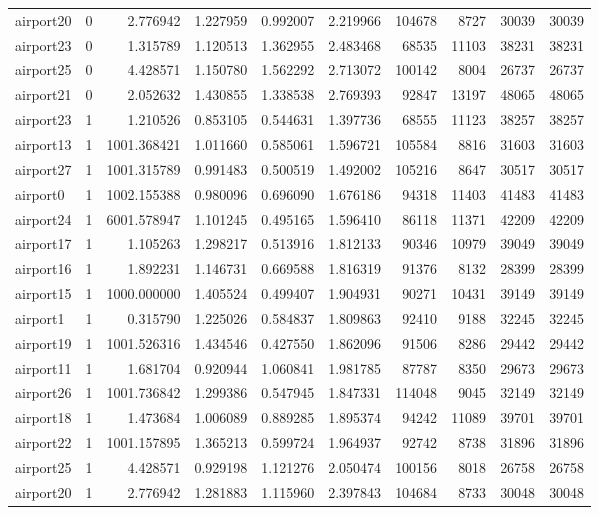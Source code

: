 \begin{longtable}{|l|r|r|r|r|r|r|r|r|r|}
airport20 & 0 & 2.776942 & 1.227959 & 0.992007 & 2.219966 & 104678 & 8727 & 30039 & 30039 \\
airport23 & 0 & 1.315789 & 1.120513 & 1.362955 & 2.483468 & 68535 & 11103 & 38231 & 38231 \\
airport25 & 0 & 4.428571 & 1.150780 & 1.562292 & 2.713072 & 100142 & 8004 & 26737 & 26737 \\
airport21 & 0 & 2.052632 & 1.430855 & 1.338538 & 2.769393 & 92847 & 13197 & 48065 & 48065 \\
airport23 & 1 & 1.210526 & 0.853105 & 0.544631 & 1.397736 & 68555 & 11123 & 38257 & 38257 \\
airport13 & 1 & 1001.368421 & 1.011660 & 0.585061 & 1.596721 & 105584 & 8816 & 31603 & 31603 \\
airport27 & 1 & 1001.315789 & 0.991483 & 0.500519 & 1.492002 & 105216 & 8647 & 30517 & 30517 \\
airport0 & 1 & 1002.155388 & 0.980096 & 0.696090 & 1.676186 & 94318 & 11403 & 41483 & 41483 \\
airport24 & 1 & 6001.578947 & 1.101245 & 0.495165 & 1.596410 & 86118 & 11371 & 42209 & 42209 \\
airport17 & 1 & 1.105263 & 1.298217 & 0.513916 & 1.812133 & 90346 & 10979 & 39049 & 39049 \\
airport16 & 1 & 1.892231 & 1.146731 & 0.669588 & 1.816319 & 91376 & 8132 & 28399 & 28399 \\
airport15 & 1 & 1000.000000 & 1.405524 & 0.499407 & 1.904931 & 90271 & 10431 & 39149 & 39149 \\
airport1 & 1 & 0.315790 & 1.225026 & 0.584837 & 1.809863 & 92410 & 9188 & 32245 & 32245 \\
airport19 & 1 & 1001.526316 & 1.434546 & 0.427550 & 1.862096 & 91506 & 8286 & 29442 & 29442 \\
airport11 & 1 & 1.681704 & 0.920944 & 1.060841 & 1.981785 & 87787 & 8350 & 29673 & 29673 \\
airport26 & 1 & 1001.736842 & 1.299386 & 0.547945 & 1.847331 & 114048 & 9045 & 32149 & 32149 \\
airport18 & 1 & 1.473684 & 1.006089 & 0.889285 & 1.895374 & 94242 & 11089 & 39701 & 39701 \\
airport22 & 1 & 1001.157895 & 1.365213 & 0.599724 & 1.964937 & 92742 & 8738 & 31896 & 31896 \\
airport25 & 1 & 4.428571 & 0.929198 & 1.121276 & 2.050474 & 100156 & 8018 & 26758 & 26758 \\
airport20 & 1 & 2.776942 & 1.281883 & 1.115960 & 2.397843 & 104684 & 8733 & 30048 & 30048 \\

\end{longtable}

